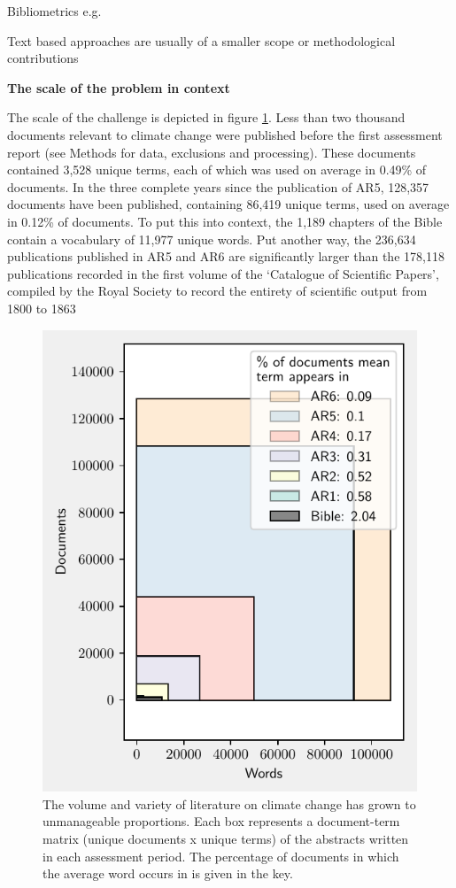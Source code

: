 \documentclass{article}
\begin{document}
Bibliometrics e.g. \citep{Haunschild2016} \citep{Grieneisen2011}

Text based approaches are usually of a smaller scope \citep{Grubert2016} or methodological contributions \citep{Blei2003}


\bigskip
\noindent\textbf{The scale of the problem in context}

The scale of the challenge is depicted in figure \ref{growth}. Less than two thousand documents relevant to climate change were published before the first assessment report (see Methods for data, exclusions and processing). These documents contained 3,528 unique terms, each of which was used on average in 0.49\% of documents. In the three complete years since the publication of AR5, 128,357 documents have been published, containing 86,419 unique terms, used on average in 0.12\% of documents. To put this into context, the 1,189 chapters of the Bible contain a vocabulary of 11,977 unique words. Put another way, the 236,634 publications published in AR5 and AR6 are significantly larger than the 178,118 publications recorded in the first volume of the `Catalogue of Scientific Papers', compiled by the Royal Society to record the entirety of scientific output from 1800 to 1863 \citep{Csiszar2017}



\begin{figure}
	\begin{center}
		\includegraphics[width=0.5\linewidth]{plots/literature_size/volume_variety.pdf}
		\caption{The volume and variety of literature on climate change has grown to unmanageable proportions. Each box represents a document-term matrix (unique documents x unique terms) of the abstracts written in each assessment period. The percentage of documents in which the average word occurs in is given in the key.
		}
		\label{growth}
	\end{center}
\end{figure}
\end{document}

